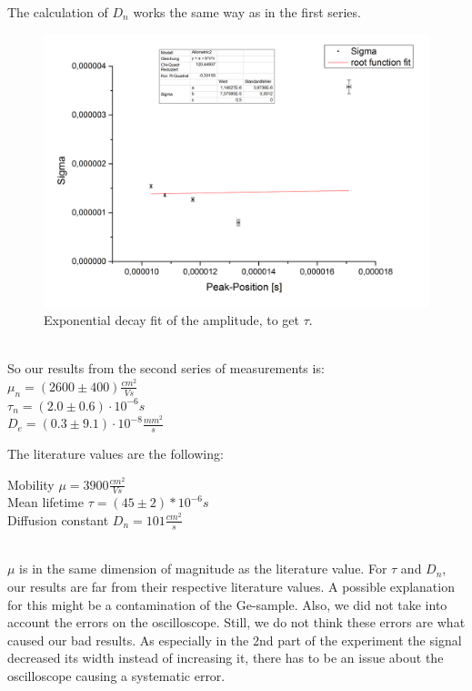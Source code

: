 \newpage
The calculation of $\mathit{D_{n}}$ works the same way as in the first series.
\begin{figure}[h]
\begin{center}
\includegraphics[scale=0.5]{Bilder/t2_2_sigma}
\caption{Exponential decay fit of the amplitude, to get $\mathit{\tau}$. }
\label{fig:2sigma}
\end{center}
\end{figure}\\
So our results from the second series of measurements is:\\

$\mathit{\mu_{n}=(2600\pm400)\frac{cm^{2}}{Vs}}$\\

$\mathit{\tau_{n}=(2.0\pm0.6)\cdot10^{-6}s}$\\

$\mathit{D_{e}=(0.3\pm9.1)\cdot10^{-8}\frac{mm^{2}}{s}}$

The literature values are the following:\\
\begin{center}
Mobility $\mu=3900 \frac{cm^2}{Vs}$\\
Mean lifetime $\tau=(45\pm 2)*10^{-6} s$\\
Diffusion constant $D_{n}=101 \frac{cm^2}{s}$
\end{center}
~\\
$\mu$ is in the same dimension of magnitude as the literature value. For $\tau$ and $D_{n}$, our results are far from their respective literature values. A possible explanation for this might be a contamination of the Ge-sample. Also, we did not take into account the errors on the oscilloscope. Still, we do not think these errors are what caused our bad results. As especially in the 2nd part of the experiment the signal decreased its width instead of increasing it, there has to be an issue about the oscilloscope causing a systematic error. 